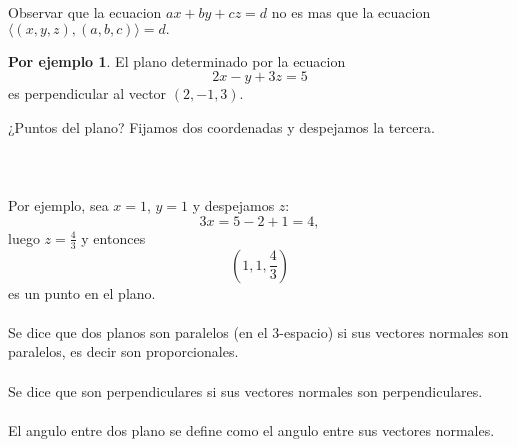 \documentclass{article}
\theoremstyle{definition}
\theoremstyle{definition}
\newtheorem*{ej}{Por ejemplo}
\theoremstyle{remark}
\begin{document}
Observar que la ecuacion $ax+by+cz=d$ no es mas que la ecuacion \mbox{$\big\langle(x,y,z),(a,b,c)\big\rangle=d.$}
\begin{ej}
  El plano determinado por la ecuacion \[
2x-y+3z=5
  \]
  es perpendicular al vector $(2,-1,3)$.
\end{ej}
¿Puntos del plano? Fijamos dos coordenadas y despejamos la tercera.\\\\
\\\\
Por ejemplo, sea $x=1$, $y=1$ y despejamos $z$: \[
3x=5-2+1=4,
\]
luego $z=\frac{4}{3}$ y entonces \[
  \left(1,1,\frac{4}{3}\right)
\]es un punto en el plano.
\\\\
Se dice que dos planos son paralelos (en el 3-espacio) si sus vectores normales son paralelos, es decir son proporcionales.\\\\
Se dice que son perpendiculares si sus vectores normales son perpendiculares.\\\\
El angulo entre dos plano se define como el angulo entre sus vectores normales.
\pagebreak
\end{document}
